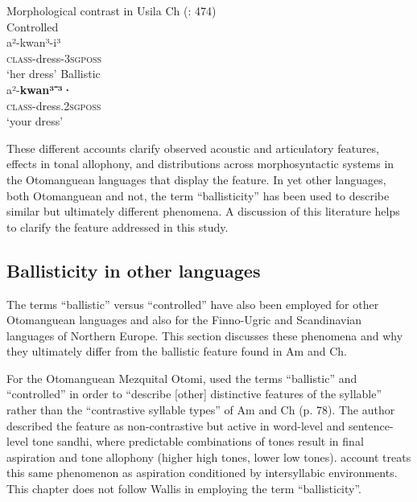 \documentclass[output=paper]{langscibook}
\begin{document}
\ea\label{ex:dobui:6}
{ Morphological contrast in Usila Ch (\citealt{SkinnerSkinner2000}: 474)}\\
\ea\label{ex:dobui:6a}
{Controlled}\\
\gll a²-kwan³-i³\\
     \textsc{class}-dress-3\textsc{sgposs}\\
\glt ‘her dress’
\ex\label{ex:dobui:6b}
{Ballistic}\\
\gll a²-\textbf{kwan³⁻³·}\\
     \textsc{class}-dress.2\textsc{sgposs}\\
\glt ‘your dress’
\z
\z

These different accounts clarify observed acoustic and articulatory features, effects in tonal allophony, and distributions across morphosyntactic systems in the Otomanguean languages that display the feature. In yet other languages, both Otomanguean and not, the term “ballisticity” has been used to describe similar but ultimately different phenomena. A discussion of this literature helps to clarify the feature addressed in this study. 

\subsection{Ballisticity in other languages}

The terms ``ballistic'' versus ``controlled'' have also been employed for other Otomanguean languages and also for the Finno-Ugric and Scandinavian languages of Northern Europe. This section discusses these phenomena and why they ultimately differ from the ballistic feature found in Am and Ch.

For the Otomanguean Mezquital Otomi, \citet{Wallis1968} used the terms ``ballistic'' and ``controlled'' in order to “describe [other] distinctive features of the syllable” rather than the “contrastive syllable types” of Am and Ch (p. 78). The author described the feature as non-contrastive but active in word-level and sentence-level tone sandhi, where predictable combinations of tones result in final aspiration and tone allophony (higher high tones, lower low tones).  account treats this same phenomenon as aspiration conditioned by intersyllabic environments. This chapter does not follow Wallis in employing the term “ballisticity”.
\end{document}
